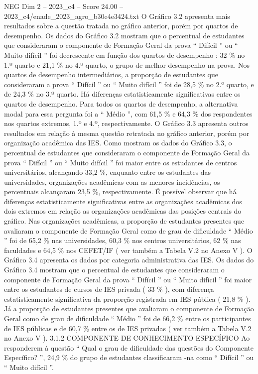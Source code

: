 \begin{textsample}{NEG Dim 2 – 2023\_c4 – Score 24.00 – 2023\_c4/enade\_2023\_agro\_b30e4e3424.txt}
O Gráfico 3.2 apresenta mais resultados sobre a questão tratada no gráfico anterior, porém por quartos de desempenho.
Os dados do Gráfico 3.2 mostram que o percentual de estudantes que consideraram o componente de Formação Geral da prova “ Difícil ” ou “ Muito difícil ” foi decrescente em função dos quartos de desempenho : 32 \% no 1.º quarto e 21,1 \% no 4.º quarto, o grupo de melhor desempenho na prova.
Nos quartos de desempenho intermediários, a proporção de estudantes que consideraram a prova “ Difícil ” ou “ Muito difícil ” foi de 28,5 \% no 2.º quarto, e de 24,3 \% no 3.º quarto.
Há diferenças estatisticamente significativas entre os quartos de desempenho.
Para todos os quartos de desempenho, a alternativa modal para essa pergunta foi a “ Médio ”, com 61,5 \% e 64,3 \% dos respondentes nos quartos extremos, 1.º e 4.º, respectivamente.
O Gráfico 3.3 apresenta outros resultados em relação à mesma questão retratada no gráfico anterior, porém por organização acadêmica das IES.
Como mostram os dados do Gráfico 3.3, o percentual de estudantes que consideraram o componente de Formação Geral da prova “ Difícil ” ou “ Muito difícil ” foi maior entre os estudantes de centros universitários, alcançando 33,2 \%, enquanto entre os estudantes das universidades, organizações acadêmicas com as menores incidências, os percentuais alcançaram 23,5 \%, respectivamente.
É possível observar que há diferenças estatisticamente significativas entre as organizações acadêmicas dos dois extremos em relação as organizações acadêmicas das posições centrais do gráfico.
Nas organizações acadêmicas, a proporção de estudantes presentes que avaliaram o componente de Formação Geral como de grau de dificuldade “ Médio ” foi de 65,2 \% nas universidades, 60,3 \% nos centros universitários, 62 \% nas faculdades e 64,5 \% nos CEFET/IF ( ver também a Tabela V.2 no Anexo V ).
O Gráfico 3.4 apresenta os dados por categoria administrativa das IES.
Os dados do Gráfico 3.4 mostram que o percentual de estudantes que consideraram o componente de Formação Geral da prova “ Difícil ” ou “ Muito difícil ” foi maior entre os estudantes de cursos de IES privada ( 33 \% ), com diferença estatisticamente significativa da proporção registrada em IES pública ( 21,8 \% ).
Já a proporção de estudantes presentes que avaliaram o componente de Formação Geral como de grau de dificuldade “ Médio ” foi de 66,2 \% entre os participantes de IES públicas e de 60,7 \% entre os de IES privadas ( ver também a Tabela V.2 no Anexo V ). 3.1.2 COMPONENTE DE CONHECIMENTO ESPECÍFICO Ao responderem à questão “ Qual o grau de dificuldade das questões do Componente Específico? ”, 24,9 \% do grupo de estudantes classificaram -na como “ Difícil ” ou “ Muito difícil ”.

\end{textsample}
